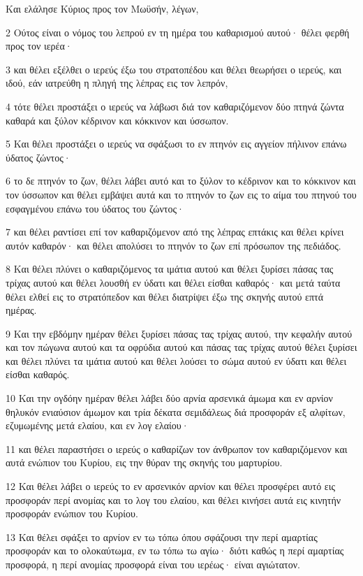 \par Και ελάλησε Κύριος προς τον Μωϋσήν, λέγων,
\par 2 Ούτος είναι ο νόμος του λεπρού εν τη ημέρα του καθαρισμού αυτού· θέλει φερθή προς τον ιερέα·
\par 3 και θέλει εξέλθει ο ιερεύς έξω του στρατοπέδου και θέλει θεωρήσει ο ιερεύς, και ιδού, εάν ιατρεύθη η πληγή της λέπρας εις τον λεπρόν,
\par 4 τότε θέλει προστάξει ο ιερεύς να λάβωσι διά τον καθαριζόμενον δύο πτηνά ζώντα καθαρά και ξύλον κέδρινον και κόκκινον και ύσσωπον.
\par 5 Και θέλει προστάξει ο ιερεύς να σφάξωσι το εν πτηνόν εις αγγείον πήλινον επάνω ύδατος ζώντος·
\par 6 το δε πτηνόν το ζων, θέλει λάβει αυτό και το ξύλον το κέδρινον και το κόκκινον και τον ύσσωπον και θέλει εμβάψει αυτά και το πτηνόν το ζων εις το αίμα του πτηνού του εσφαγμένου επάνω του ύδατος του ζώντος·
\par 7 και θέλει ραντίσει επί τον καθαριζόμενον από της λέπρας επτάκις και θέλει κρίνει αυτόν καθαρόν· και θέλει απολύσει το πτηνόν το ζων επί πρόσωπον της πεδιάδος.
\par 8 Και θέλει πλύνει ο καθαριζόμενος τα ιμάτια αυτού και θέλει ξυρίσει πάσας τας τρίχας αυτού και θέλει λουσθή εν ύδατι και θέλει είσθαι καθαρός· και μετά ταύτα θέλει ελθεί εις το στρατόπεδον και θέλει διατρίψει έξω της σκηνής αυτού επτά ημέρας.
\par 9 Και την εβδόμην ημέραν θέλει ξυρίσει πάσας τας τρίχας αυτού, την κεφαλήν αυτού και τον πώγωνα αυτού και τα οφρύδια αυτού και πάσας τας τρίχας αυτού θέλει ξυρίσει και θέλει πλύνει τα ιμάτια αυτού και θέλει λούσει το σώμα αυτού εν ύδατι και θέλει είσθαι καθαρός.
\par 10 Και την ογδόην ημέραν θέλει λάβει δύο αρνία αρσενικά άμωμα και εν αρνίον θηλυκόν ενιαύσιον άμωμον και τρία δέκατα σεμιδάλεως διά προσφοράν εξ αλφίτων, εζυμωμένης μετά ελαίου, και εν λογ ελαίου·
\par 11 και θέλει παραστήσει ο ιερεύς ο καθαρίζων τον άνθρωπον τον καθαριζόμενον και αυτά ενώπιον του Κυρίου, εις την θύραν της σκηνής του μαρτυρίου.
\par 12 Και θέλει λάβει ο ιερεύς το εν αρσενικόν αρνίον και θέλει προσφέρει αυτό εις προσφοράν περί ανομίας και το λογ του ελαίου, και θέλει κινήσει αυτά εις κινητήν προσφοράν ενώπιον του Κυρίου.
\par 13 Και θέλει σφάξει το αρνίον εν τω τόπω όπου σφάζουσι την περί αμαρτίας προσφοράν και το ολοκαύτωμα, εν τω τόπω τω αγίω· διότι καθώς η περί αμαρτίας προσφορά, η περί ανομίας προσφορά είναι του ιερέως· είναι αγιώτατον.
